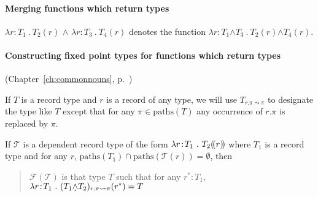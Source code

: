 \paragraph{Merging functions which return types}

$\lambda r\!:\!T_1\ .\ T_2(r)$ \d{\d{$\wedge$}} $\lambda r\!:\!T_3\ .\ T_4(r)$
denotes the function $\lambda r\!:\!T_1$\d{$\wedge$}$T_3\ .\
T_2(r)$\d{$\wedge$}$T_4(r)$.

\paragraph{Constructing fixed point types for functions which return
  types} (Chapter~\ref{ch:commonnouns}, p.~\pageref{ex:fixedpointtype})
\label{pg:fixedpointtype}



If $T$ is a
  record type and $r$ is a record of any type, we will use
  $T_{r.\pi\leadsto\pi}$ to designate the type like $T$ except that
  for any $\pi\in\mathrm{paths}(T)$ any occurrence of $r.\pi$ is
  replaced by $\pi$.

  If $\mathcal{T}$ is a dependent record type of the form $\lambda
r\!:\!T_1\ .\ T_2(\!(r)\!)$ where $T_1$ is a record type and for any
$r$,
$\mathrm{paths}(T_1)\cap\mathrm{paths}(\mathcal{T}(r))=\emptyset$,
then
\begin{quote}
  $\mathcal{F}(\mathcal{T})$ is that type $T$ such that for any
  $r^*:T_1$, $\lambda r\!:\!T_1\ .\
  (T_1\text{\d{$\wedge$}}T_2)_{r.\pi\leadsto\pi}(r^*)=T$
\end{quote}


